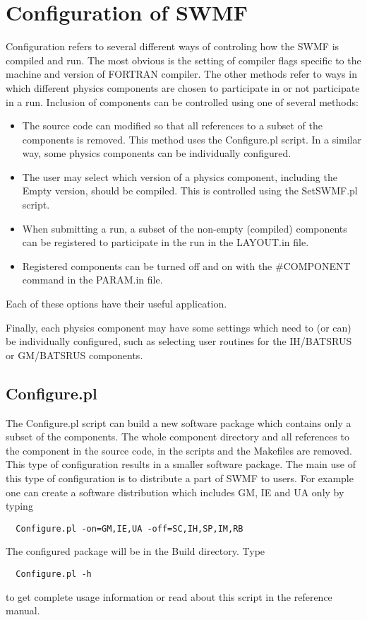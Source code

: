 \section{Configuration of SWMF}

Configuration refers to several different ways of controling how the 
SWMF is compiled and run.  The most obvious is the setting of
compiler flags specific to the machine and version of FORTRAN
compiler.  The other methods refer to ways in which different physics
components are chosen to participate in or not participate in a run.
Inclusion of components can be controlled using one of several methods:

\begin{itemize}
\item The source code can modified so that all references %
      to a subset of the components is removed. %
      This method uses the Configure.pl script. %
      In a similar way, some physics components can be individually
      configured.
\item The user may select which version of a physics component,
  including the Empty version,
      should be compiled.  This is controlled using the SetSWMF.pl script.
\item When submitting a run, a subset of the non-empty (compiled) 
      components can be
      registered to participate in the run in the LAYOUT.in file.
\item Registered components can be turned off and on with the \#COMPONENT
      command in the PARAM.in file.
\end{itemize}
Each of these options have their useful application.

Finally, each physics component may have some settings which need to
(or can) be individually
configured, such as selecting user routines for the IH/BATSRUS or
GM/BATSRUS components.

\subsection{Configure.pl}
The Configure.pl script can build a new software package which
contains only a subset of the components. The whole
component directory and all references to the component 
in the source code, in the scripts and the Makefiles are removed.
This type of configuration results in a smaller software package.
The main use of this type of configuration is to distribute
a part of SWMF to users. For example one can create a 
software distribution which includes GM, IE and UA only by typing
\begin{verbatim}
  Configure.pl -on=GM,IE,UA -off=SC,IH,SP,IM,RB
\end{verbatim}
The configured package will be in the Build directory.  Type
\begin{verbatim}
  Configure.pl -h
\end{verbatim}
to get complete usage information or read about this script 
in the reference manual.


